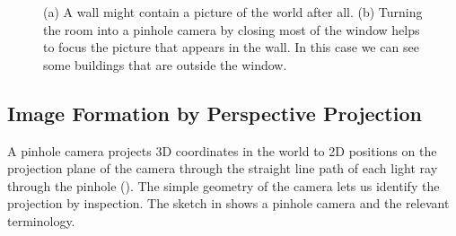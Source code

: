 \begin{figure}[t]
\centerline{
}
\caption{(a) A wall might contain a picture of the world after all. (b) Turning the room into a pinhole camera by closing most of the window helps to focus the picture that appears in the wall. In this case we can see some buildings that are outside the window.}
\label{fig:accidental}
\end{figure}


\subsection{Image Formation by Perspective Projection}

A pinhole camera projects 3D coordinates in
the world to 2D positions on the projection plane of the camera
through the straight line path of each light ray through the pinhole (\fig{\ref{fig:wallpicture}}).  The simple geometry of the camera lets us identify the projection by inspection. The sketch in \fig{\ref{fig:pinhole_names}} shows a pinhole camera and the relevant terminology. 


